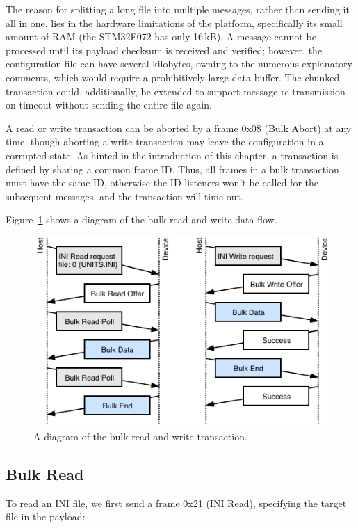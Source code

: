 The reason for splitting a long file into multiple messages, rather than sending it all in one, lies in the hardware limitations of the platform, specifically its small amount of \gls{RAM} (the STM32F072 has only 16\,kB). A message cannot be processed until its payload checksum is received and verified; however, the configuration file can have several kilobytes, owning to the numerous explanatory comments, which would require a prohibitively large data buffer. The chunked transaction could, additionally, be extended to support message re-transmission on timeout without sending the entire file again.

A read or write transaction can be aborted by a frame 0x08 (Bulk Abort) at any time, though aborting a write transaction may leave the configuration in a corrupted state. As hinted in the introduction of this chapter, a transaction is defined by sharing a common frame ID. Thus, all frames in a bulk transaction must have the same ID, otherwise the ID listeners won't be called for the subsequent messages, and the transaction will time out.

Figure~\ref{fig:bulk-rw} shows a diagram of the bulk read and write data flow.

\begin{figure}
	\centering
	\includegraphics[scale=1.5]{img/bulk-read-write.pdf}
	\caption{\label{fig:bulk-rw}A diagram of the bulk read and write transaction.}
\end{figure}

\subsection{Bulk Read}

To read an INI file, we first send a frame 0x21 (INI Read), specifying the target file in the payload:

